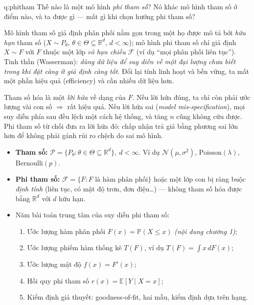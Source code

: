\begin{cauhoi}{q:phitham}
Thế nào là một mô hình \textit{phi tham số}? Nó khác mô hình tham số ở điểm nào, và ta được gì --- mất gì khi chọn hướng phi tham số?
\end{cauhoi}

\begin{chot}
Mô hình tham số giả định phân phối nằm gọn trong một họ được mô tả bởi \emph{hữu hạn} tham số ($X\sim P_\theta$, $\theta\in\Theta\subseteq\mathbb{R}^d$, $d<\infty$); mô hình phi tham số chỉ giả định $X\sim F$ với $F$ thuộc một lớp \emph{vô hạn chiều} $\mathcal{F}$ (ví dụ ``mọi phân phối liên tục''). Tinh thần (Wasserman): \emph{dùng dữ liệu để suy diễn về một đại lượng chưa biết trong khi đặt càng ít giả định càng tốt}. Đổi lại tính linh hoạt và bền vững, ta mất một phần hiệu quả (efficiency) và cần nhiều dữ liệu hơn.
\end{chot}

Tham số hóa là một \emph{lời hứa} về dạng của $F$. Nếu lời hứa đúng, ta chỉ còn phải ước lượng vài con số $\Rightarrow$ rất hiệu quả. Nếu lời hứa sai (\textit{model mis-specification}), mọi suy diễn phía sau đều lệch một cách hệ thống, và tăng $n$ cũng không cứu được. Phi tham số từ chối đưa ra lời hứa đó: chấp nhận trả giá bằng phương sai lớn hơn để không phải gánh rủi ro chệch do sai mô hình.

\begin{itemize}
\item \textbf{Tham số:} $\mathcal{P}=\{P_\theta:\theta\in\Theta\subseteq\mathbb{R}^d\},\ d<\infty$. Ví dụ $\mathcal{N}(\mu,\sigma^2)$, $\mathrm{Poisson}(\lambda)$, $\mathrm{Bernoulli}(p)$.
\item \textbf{Phi tham số:} $\mathcal{F}=\{F: F \text{ là hàm phân phối}\}$ hoặc một lớp con bị ràng buộc \emph{định tính} (liên tục, có mật độ trơn, đơn điệu\dots) --- không tham số hóa được bằng $\mathbb{R}^d$ với $d$ hữu hạn.
\item Năm bài toán trung tâm của suy diễn phi tham số:
  \begin{enumerate}
  \item Ước lượng hàm phân phối $F(x)=\mathbb{P}(X\le x)$ \textit{(nội dung chương 1)};
  \item Ước lượng phiếm hàm thống kê $T(F)$, ví dụ $T(F)=\int x\,dF(x)$;
  \item Ước lượng mật độ $f(x)=F'(x)$;
  \item Hồi quy phi tham số $r(x)=\mathbb{E}[Y\mid X=x]$;
  \item Kiểm định giả thuyết: goodness-of-fit, hai mẫu, kiểm định dựa trên hạng.
  \end{enumerate}
\end{itemize}

